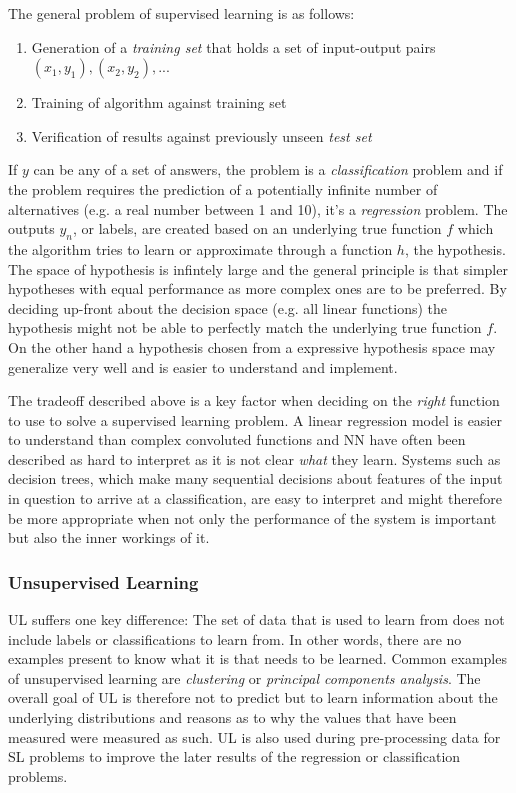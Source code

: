 The general problem of supervised learning is as follows:

\begin{enumerate} 
    \item Generation of a \emph{training set} that holds a set of input-output pairs \\
	    $(x_1,y_1),(x_2,y_2),...$ 
    \item Training of algorithm against training set 
    \item Verification of results against previously unseen \emph{test set} 
\end{enumerate}

If $y$ can be any of a set of answers, the problem is a \emph{classification}
problem and if the problem requires the prediction of a potentially infinite
number of alternatives (e.g. a real number between 1 and 10), it's a
\emph{regression} problem. The outputs $y_n$, or labels, are created based on an
underlying true function $f$ which the algorithm tries to learn or approximate
through a function $h$, the hypothesis. The space of hypothesis is infintely
large and the general principle is that simpler hypotheses with equal
performance as more complex ones are to be preferred. By deciding up-front about
the decision space (e.g. all linear functions) the hypothesis might not be able
to perfectly match the underlying true function $f$. On the other hand a
hypothesis chosen from a expressive hypothesis space may generalize very well
and is easier to understand and implement. 

The tradeoff described above is a key factor when deciding on the \emph{right}
function to use to solve a supervised learning problem. A linear regression
model is easier to understand than complex convoluted functions and \ac {NN}
have often been described as hard to interpret as it is not clear \emph{what}
they learn. Systems such as decision trees, which make many sequential decisions
about features of the input in question to arrive at a classification, are easy
to interpret and might therefore be more appropriate when not only the
performance of the system is important but also the inner workings of it.
\subsubsection{Unsupervised Learning}
\acl {UL}  suffers one key difference: The set of data that is used to learn from does not include labels or
classifications to learn from. In other words, there are no examples present to know what it is that needs to be
learned. Common examples of unsupervised learning are \emph{clustering} or \emph{principal components analysis}. The
overall goal of \ac {UL} is therefore not to predict but to learn information about the underlying distributions and
reasons as to why the values that have been measured were measured as such. \ac {UL} is also used during pre-processing
data for \ac {SL} problems to improve the later results of the regression or classification problems. 

